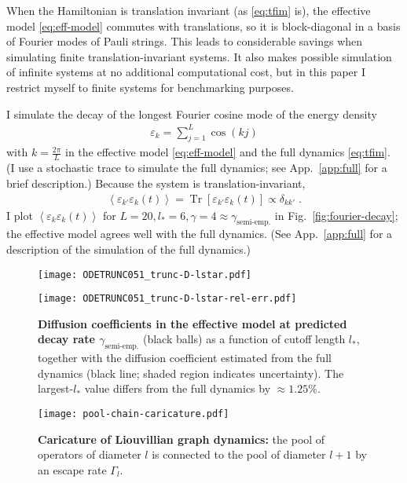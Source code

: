 \documentclass[aps,prb,nofootinbib,twocolumn,balancelastpage,amsmath,amssymb,floatfix,superscriptaddress,]{revtex4-1}
\newcommand{\tr}{\operatorname{Tr}}
\newcommand{\expct}[1]{\left\langle #1 \right\rangle}
\newcommand{\semiemp}{\text{semi-emp.}}
\begin{document}
{ When the Hamiltonian is translation invariant (as \eqref{eq:tfim} is),
 the effective model \eqref{eq:eff-model} commutes with translations,
 so it is block-diagonal in a basis of Fourier modes of Pauli strings.
 This leads to considerable savings  when simulating finite translation-invariant systems.
 It also makes possible simulation of infinite systems at no additional computational cost,
 but in this paper I restrict myself to finite systems for benchmarking purposes.
 

I simulate the decay of the longest Fourier cosine mode of the energy density
\begin{align}
  \label{eq:cosine-mode}
  \varepsilon_{k} = \sum_{j = 1}^L \cos(kj)
\end{align}
with $k = \frac{2\pi}{L}$ in the effective model \eqref{eq:eff-model} and the full dynamics \eqref{eq:tfim}.
(I use a stochastic trace to simulate the full dynamics;
see App.~\ref{app:full} for a brief description.)
Because the system is translation-invariant,
\begin{align}
  \expct{\varepsilon_{k'}\varepsilon_k(t)} = \tr[\varepsilon_{k'}\varepsilon_k(t)] \propto \delta_{kk'}\;.
\end{align}
I plot $\expct{\varepsilon_k\varepsilon_k(t)}$ for $L = 20, l_* = 6, \gamma = 4 \approx \gamma_{\semiemp}$ in Fig.~\eqref{fig:fourier-decay};
the effective model agrees well with the full dynamics.
(See App.~\ref{app:full} for a description of the simulation of the full dynamics.)

\begin{figure}[t]
  \texttt{[image: ODETRUNC051\_trunc-D-lstar.pdf]}
  
  \texttt{[image: ODETRUNC051\_trunc-D-lstar-rel-err.pdf]}
  \caption{
    \textbf{ Diffusion coefficients in the effective model at predicted decay rate $\gamma_{\semiemp}$ } (black balls) as a function of cutoff length $l_*$,
    together with the diffusion coefficient estimated from the full dynamics
    (black line; shaded region indicates uncertainty).
    The largest-$l_*$ value differs from the full dynamics by $\approx 1.25 \%$.
  }
  \label{fig:diffusion-lstar}
\end{figure}


\begin{figure*}[t]
  \centering\texttt{[image: pool-chain-caricature.pdf]}
  \caption{
    \textbf{Caricature of Liouvillian graph dynamics:} the pool of operators of diameter $l$ is connected to the pool of diameter $l+1$ by an escape rate $\Gamma_l$.
  }
  \label{fig:pool-chain-caricature}
\end{figure*}


}
\end{document}
